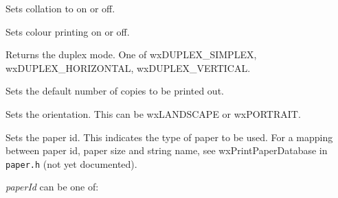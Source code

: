 \label{wxprintdatasetcollate}


Sets collation to on or off.


\label{wxprintdatasetcolour}


Sets colour printing on or off.


\label{wxprintdatasetduplex}


Returns the duplex mode. One of wxDUPLEX\_SIMPLEX, wxDUPLEX\_HORIZONTAL, wxDUPLEX\_VERTICAL.


\label{wxprintdatasetnocopies}


Sets the default number of copies to be printed out.


\label{wxprintdatasetorientation}


Sets the orientation. This can be wxLANDSCAPE or wxPORTRAIT.


\label{wxprintdatasetpaperid}


Sets the paper id. This indicates the type of paper to be used. For a mapping between
paper id, paper size and string name, see wxPrintPaperDatabase in {\tt paper.h} (not yet documented).

{\it paperId} can be one of:

